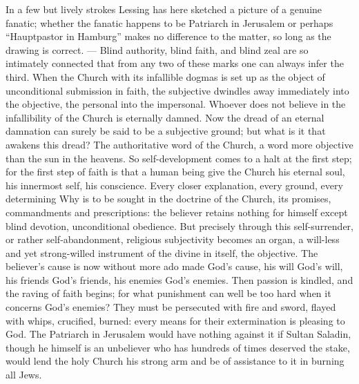 \documentclass[12pt,a4paper,openany]{book}
\newcommand{\opage}[1]{\marginnote{\footnotesize\textit{[#1]}}}
\begin{document}
In a few but lively strokes Lessing has here sketched
a picture of a genuine fanatic; whether the fanatic happens
to be Patriarch in Jerusalem or perhaps ``Hauptpastor
in Hamburg'' makes no difference to the matter, so long as the drawing
is correct. --- Blind authority, blind faith,
and blind zeal are so intimately connected that from
any two of these marks one can always infer the
third. When the Church with its infallible dogmas is set up
as the object of unconditional submission in faith, the
subjective dwindles away immediately into the objective,
the personal into the impersonal. Whoever does not believe
in the infallibility of the Church is eternally damned. Now
the dread of an eternal damnation can surely be said to be
a subjective ground; but what is it that awakens this
dread? The authoritative word of the Church, a word more objective
than the sun in the heavens. So self-development comes to a halt at
the first step; for the first step of faith is that a human being
give the Church his eternal soul, his innermost self, his conscience.
Every closer explanation, every ground, every
determining Why is to be sought in the doctrine of the Church, its
promises, commandments and prescriptions: the believer retains
\setcounter{footnote}{0}%
\opage{607}nothing for himself except blind devotion, unconditional
obedience. But precisely through this self-surrender,
or rather self-abandonment, religious subjectivity becomes
an organ, a will-less and yet strong-willed instrument
of the divine in itself, the objective. The believer's
cause is now without more ado made God's cause, his will
God's will, his friends God's friends, his
enemies God's enemies. Then passion is kindled, and
the raving of faith begins; for what punishment can well be
too hard when it concerns God's enemies? They must be
persecuted with fire and sword, flayed with whips, crucified,
burned: every means for their extermination is pleasing
to God. The Patriarch in Jerusalem would have nothing
against it if Sultan Saladin, though he himself is an unbeliever
who has hundreds of times deserved the stake, would lend
the holy Church his strong arm and be of assistance to it
in burning all Jews.
\end{document}
